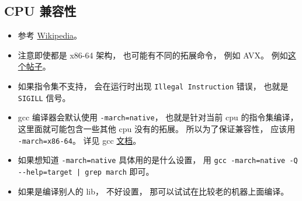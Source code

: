 
\begin{issues}
\issueDraft
\end{issues}


\subsection{CPU 兼容性}

\begin{itemize}
\item 参考 \href{https://en.wikipedia.org/wiki/Binary-code_compatibility}{Wikipedia}。
\item 注意即使都是 x86-64 架构， 也可能有不同的拓展命令， 例如 AVX。 例如\href{https://stackoverflow.com/questions/50945287/illegal-instruction-when-run-precompiled-program-on-other-machine}{这个帖子}。
\item 如果指令集不支持， 会在运行时出现 \verb`Illegal Instruction` 错误， 也就是 \verb`SIGILL` 信号。
\item gcc 编译器会默认使用 \verb`-march=native`， 也就是针对当前 cpu 的指令集编译， 这里面就可能包含一些其他 cpu 没有的拓展。 所以为了保证兼容性， 应该用 \verb`-march=x86-64`。 详见 gcc \href{https://gcc.gnu.org/onlinedocs/gcc/x86-Options.html}{文档}。
\item 如果想知道 \verb`-march=native` 具体用的是什么设置， 用 \verb`gcc -march=native -Q --help=target | grep march` 即可。
\item 如果是编译别人的 lib， 不好设置， 那可以试试在比较老的机器上面编译。
\end{itemize}

